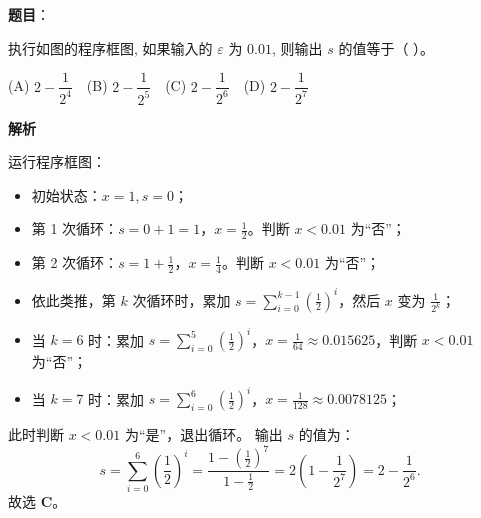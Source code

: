 \begin{answer}

\textbf{题目}：

执行如图的程序框图, 如果输入的 $\varepsilon$ 为 $0.01$, 则输出 $s$ 的值等于（ ）。
\nopagebreak[4]
\begin{center}\end{center}
\nopagebreak[4]
(A) $2 - \dfrac{1}{2^4}$　(B) $2 - \dfrac{1}{2^5}$　(C) $2 - \dfrac{1}{2^6}$　(D) $2 - \dfrac{1}{2^7}$

\textbf{解析}

运行程序框图：
\begin{itemize}
\item 初始状态：$x = 1, s = 0$；
\item 第 1 次循环：$s = 0 + 1 = 1$，$x = \frac{1}{2}$。判断 $x < 0.01$ 为“否”；
\item 第 2 次循环：$s = 1 + \frac{1}{2}$，$x = \frac{1}{4}$。判断 $x < 0.01$ 为“否”；
\item 依此类推，第 $k$ 次循环时，累加 $s = \sum_{i=0}^{k-1} \left(\frac{1}{2}\right)^i$，然后 $x$ 变为 $\frac{1}{2^k}$；
\item 当 $k = 6$ 时：累加 $s = \sum_{i=0}^5 \left(\frac{1}{2}\right)^i$，$x = \frac{1}{64} \approx 0.015625$，判断 $x < 0.01$ 为“否”；
\item 当 $k = 7$ 时：累加 $s = \sum_{i=0}^6 \left(\frac{1}{2}\right)^i$，$x = \frac{1}{128} \approx 0.0078125$；
\end{itemize}
  此时判断 $x < 0.01$ 为“是”，退出循环。
输出 $s$ 的值为：
\nopagebreak[4]
\[s = \sum_{i=0}^6 \left(\frac{1}{2}\right)^i = \frac{1 - \left(\frac{1}{2}\right)^7}{1 - \frac{1}{2}} = 2\left(1 - \frac{1}{2^7}\right) = 2 - \frac{1}{2^6}.\]
故选 \textbf{C}。


\end{answer}
